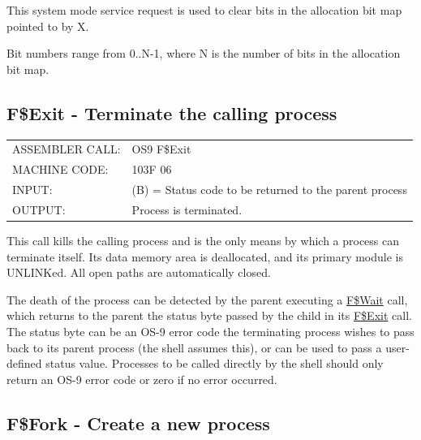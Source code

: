 \documentclass[
]{article}
\newcounter{none} %
\begin{document}
This system mode service request is used to clear bits in the allocation
bit map pointed to by X.

Bit numbers range from 0..N-1, where N is the number of bits in the
allocation bit map.

\subsection{F\$Exit - Terminate the calling process}\label{f.exit}

{\def\LTcaptype{none} %
\begin{longtable}[]{@{}
  >{\raggedright\arraybackslash}p{}
  >{\raggedright\arraybackslash}p{}@{}}
\toprule\noalign{}
\endhead
\bottomrule\noalign{}
\endlastfoot
ASSEMBLER CALL: & OS9 F\$Exit \\
MACHINE CODE: & 103F 06 \\
INPUT: & (B) = Status code to be returned to the parent process \\
OUTPUT: & Process is terminated. \\
\end{longtable}
}

This call kills the calling process and is the only means by which a
process can terminate itself. Its data memory area is deallocated, and
its primary module is UNLINKed. All open paths are automatically closed.

The death of the process can be detected by the parent executing a
\hyperref[f.wait]{F\$Wait} call, which returns to the parent the status
byte passed by the child in its \hyperref[f.exit]{F\$Exit} call. The
status byte can be an OS-9 error code the terminating process wishes to
pass back to its parent process (the shell assumes this), or can be used
to pass a user-defined status value. Processes to be called directly by
the shell should only return an OS-9 error code or zero if no error
occurred.

\subsection{F\$Fork - Create a new process}\label{f.fork}
\end{document}
